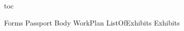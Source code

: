 \documentclass[12pt,letterpaper]{article}
\begin{document}

    {toc}

    {Forms}
    {Passport}
    {Body}
    {WorkPlan}
    {ListOfExhibits}
    {Exhibits}
\end{document}
